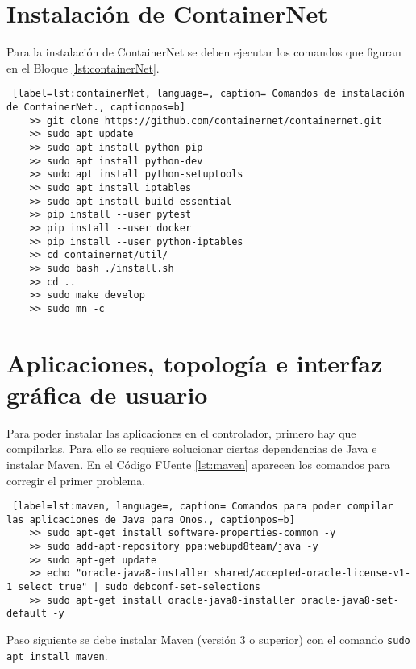 \section {Instalación de ContainerNet}

Para la instalación de ContainerNet se deben ejecutar los comandos que figuran en el Bloque \ref{lst:containerNet}.\\

\begin{lstlisting} [label=lst:containerNet, language=, caption= Comandos de instalación de ContainerNet., captionpos=b]
    >> git clone https://github.com/containernet/containernet.git
    >> sudo apt update
    >> sudo apt install python-pip 
    >> sudo apt install python-dev 
    >> sudo apt install python-setuptools 
    >> sudo apt install iptables 
    >> sudo apt install build-essential 
    >> pip install --user pytest 
    >> pip install --user docker 
    >> pip install --user python-iptables 
    >> cd containernet/util/
    >> sudo bash ./install.sh
    >> cd .. 
    >> sudo make develop 
    >> sudo mn -c
\end{lstlisting}


\section {Aplicaciones, topología e interfaz gráfica de usuario}

Para poder instalar las aplicaciones en el controlador, primero hay que compilarlas. Para ello se requiere solucionar ciertas dependencias de Java e instalar Maven. En el Código FUente \ref{lst:maven} aparecen los comandos para corregir el primer problema.\\


\begin{lstlisting} [label=lst:maven, language=, caption= Comandos para poder compilar las aplicaciones de Java para Onos., captionpos=b]
    >> sudo apt-get install software-properties-common -y 
    >> sudo add-apt-repository ppa:webupd8team/java -y 
    >> sudo apt-get update 
    >> echo "oracle-java8-installer shared/accepted-oracle-license-v1-1 select true" | sudo debconf-set-selections
    >> sudo apt-get install oracle-java8-installer oracle-java8-set-default -y
\end{lstlisting}




Paso siguiente se debe instalar Maven (versión 3 o superior) con el comando \texttt{sudo apt install maven}.


